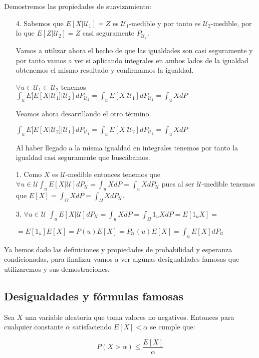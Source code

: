 \begin{demostracion}
	Demostremos las propiedades de suavizamiento:
	\begin{enumerate}
		\item[4.] Sabemos que $E[X | \mathcal{U}_1] = Z$ es $\mathcal{U}_1$-medible y por tanto es $\mathcal{U}_2$-medible, por lo que $E[Z | \mathcal{U}_2] = Z$ casi seguramente $P_{\mathcal{U}_2}$.
		
		Vamos a utilizar ahora el hecho de que las igualdades son casi seguramente y por tanto vamos a ver si aplicando integrales en ambos lados de la igualdad obtenemos el mismo resultado y confirmamos la igualdad.
		
		$\forall u\in \mathcal{U}_1 \subset \mathcal{U}_2$ tenemos $\int_{u} E[E[X | \mathcal{U}_1] | \mathcal{U}_2]dP_{\mathcal{U}_2} = \int_{u}E[X | \mathcal{U}_1]dP_{\mathcal{U}_1} = \int_{u}XdP$
		
		Veamos ahora desarrillando el otro término.
		
		$\int_{u} E[E[X | \mathcal{U}_2] | \mathcal{U}_1]dP_{\mathcal{U}_1} = \int_{u}E[X | \mathcal{U}_2] dP_{\mathcal{U}_2} = \int_{u}XdP$
		
		Al haber llegado a la misma igualdad en integrales tenemos por tanto la igualdad casi seguramente que buscábamos.
		\item[1.] Como $X$ es $\mathcal{U}$-medible entonces tenemos que $\forall u \in \mathcal{U} \int_{u}E[X | \mathcal{U}] dP_{\mathcal{U}} = \int_{u}XdP = \int_{u}XdP_{\mathcal{U}}$ pues al ser $\mathcal{U}$-medible tenemos que $E[X] = \int_{\Omega} XdP = \int_{\Omega}XdP_{\mathcal{U}}$.
		\item[3.] $\forall u \in \mathcal{U}$ $\int_{u}E[X | \mathcal{U}]dP_{\mathcal{U}} = \int_{u} XdP = \int_{\Omega}1_{u}XdP = E[1_u X] = $
		
		$= E[1_u]E[X] = P(u)E[X] = P_{\mathcal{U}}(u)E[X] = \int_{u}E[X]dP_{\mathcal{U}}$
	\end{enumerate}
\end{demostracion}

Ya hemos dado las definiciones y propiedades de probabilidad y esperanza condicionadas, para finalizar vamos a ver algunas desigualdades famosas que utilizaremos y sus demostraciones.

\subsection{Desigualdades y fórmulas famosas}

\begin{teorema}
	Sea $X$ una variable aleatoria que toma valores no negativos. Entonces para cualquier constante $\alpha$ satisfaciendo $E[X]<\alpha$ se cumple que:
	
	$$P(X>\alpha) \leq \frac{E[X]}{\alpha}$$
\end{teorema}

